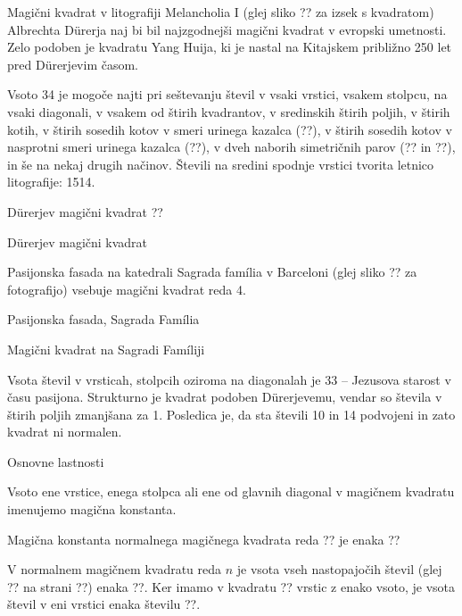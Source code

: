 \documentclass[a4paper,12pt]{article}
\begin{document}
Magični kvadrat v litografiji Melancholia I (glej sliko ??
za izsek s kvadratom) Albrechta Dürerja naj bi bil najzgodnejši magični kvadrat
v evropski umetnosti. Zelo podoben je kvadratu Yang Huija, ki je nastal na Kitajskem
približno 250 let pred Dürerjevim časom.

Vsoto 34 je mogoče najti pri seštevanju števil v vsaki vrstici, vsakem stolpcu,
na vsaki diagonali, v vsakem od štirih kvadrantov, v sredinskih štirih poljih,
v štirih kotih, v štirih sosedih kotov v smeri urinega kazalca (??), v
štirih sosedih kotov v nasprotni smeri urinega kazalca (??), v dveh naborih
simetričnih parov (?? in ??), in še na nekaj drugih načinov.
Števili na sredini spodnje vrstici tvorita letnico litografije: 1514.

Dürerjev magični kvadrat ??

Dürerjev magični kvadrat

Pasijonska fasada na katedrali Sagrada família v Barceloni
(glej sliko ?? za fotografijo) vsebuje magični kvadrat reda 4.

Pasijonska fasada, Sagrada Família

Magični kvadrat na Sagradi Famíliji

Vsota števil v vrsticah, stolpcih oziroma na diagonalah je 33 -- Jezusova starost
v času pasijona. Strukturno je kvadrat podoben Dürerjevemu, vendar so števila
v štirih poljih zmanjšana za 1. Posledica je, da sta števili 10 in 14 podvojeni
in zato kvadrat ni normalen.


Osnovne lastnosti

   Vsoto ene vrstice, enega stolpca ali ene od glavnih diagonal
   v magičnem kvadratu imenujemo magična konstanta.

   Magična konstanta normalnega magičnega kvadrata reda ??
   je enaka
   ??

   V normalnem magičnem kvadratu reda $n$ je vsota vseh nastopajočih
   števil (glej ?? na strani ??) enaka
   ??. Ker imamo
   v kvadratu ?? vrstic z enako vsoto, je vsota števil v eni vrstici
   enaka številu ??.
\end{document}
